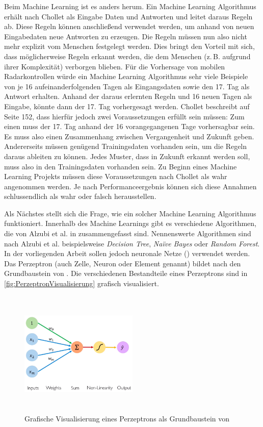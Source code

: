Beim Machine Learning ist es anders herum.
Ein Machine Learning Algorithmus erhält nach Chollet als Eingabe Daten und Antworten und leitet daraus Regeln ab.
Diese Regeln können anschließend verwendet werden, um anhand von neuen Eingabedaten neue Antworten zu erzeugen.
Die Regeln müssen nun also nicht mehr explizit vom Menschen festgelegt werden.
Dies bringt den Vorteil mit sich, dass möglicherweise Regeln erkannt werden, die dem Menschen (z.\,B. aufgrund ihrer Komplexität) verborgen blieben.
Für die Vorhersage von mobilen Radarkontrollen würde ein Machine Learning Algorithmus sehr viele Beispiele von je 16 aufeinanderfolgenden Tagen als Eingangsdaten sowie den 17. Tag als Antwort erhalten.
Anhand der daraus erlernten Regeln und 16 neuen Tagen als Eingabe, könnte dann der 17. Tag vorhergesagt werden.
Chollet beschreibt auf Seite 152, dass hierfür jedoch zwei Voraussetzungen erfüllt sein müssen:
Zum einen muss der 17. Tag anhand der 16 vorangegangenen Tage vorhersagbar sein.
Es muss also einen Zusammenhang zwischen Vergangenheit und Zukunft geben.
Andererseits müssen genügend Trainingsdaten vorhanden sein, um die Regeln daraus ableiten zu können.
Jedes Muster, dass in Zukunft erkannt werden soll, muss also in den Trainingsdaten vorhanden sein.
Zu Beginn eines Machine Learning Projekts müssen diese Voraussetzungen nach Chollet als wahr angenommen werden.
Je nach Performanceergebnis können sich diese Annahmen schlussendlich als wahr oder falsch herausstellen.

Als Nächstes stellt sich die Frage, wie ein solcher Machine Learning Algorithmus funktioniert.
Innerhalb des Machine Learnings gibt es verschiedene Algorithmen, die von Alzubi et al. in \cite{MachineLearningOverview} zusammengefasst sind.
Nennenswerte Algorithmen sind nach Alzubi et al. beispielsweise \emph{Decision Tree}, \emph{Na\"ive Bayes} oder \emph{Random Forest}.
In der vorliegenden Arbeit sollen jedoch neuronale Netze () verwendet werden.
Das Perzeptron (auch Zelle, Neuron oder Element genannt) bildet nach \cite{6S191Intro} den Grundbaustein von .
Die verschiedenen Bestandteile eines Perzeptrons sind in \autoref{fig:PerzeptronVisualisierung} grafisch visualisiert.

\begin{figure}[h]
    \centering
    \includegraphics[width=0.5\textwidth,height=6cm,keepaspectratio=true]{content/images/PerzeptronVisualisierung.png}
    \caption{Grafische Visualisierung eines Perzeptrons als Grundbaustein von  \cite{6S191Intro}}
    \label{fig:PerzeptronVisualisierung}
\end{figure}

